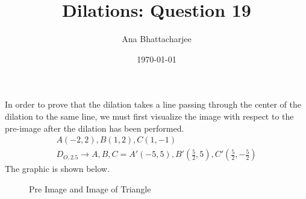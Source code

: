 \documentclass{article}
\begin{document}
\title{Dilations: Question 19}
\author{Ana Bhattacharjee}
\date{\today}
\maketitle{}


\begin{center}
In order to prove that the dilation takes a line passing through the center of the dilation to the same line, we must first visualize the image with respect to the pre-image after the dilation has been performed.
\begin{align}
  A(-2,2), B(1,2), C(1, -1) \\
  D_{O, 2.5} \rightarrow A,B,C = A' (-5, 5), B' (\frac{5}{2}, 5), C' (\frac{5}{2}, - \frac{5}{2})
\end{align}
The graphic is shown below.
\begin{figure}[!htbp]
  \caption{Pre Image and Image of Triangle}
\end{figure}
\end{center}
\end{document}
